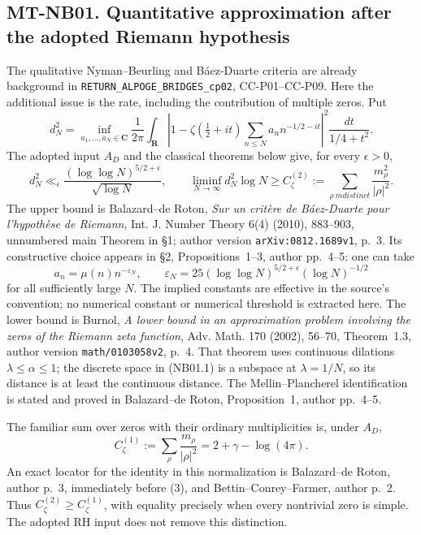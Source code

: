 \subsection*{MT-NB01. Quantitative approximation after the adopted Riemann hypothesis}

The qualitative Nyman--Beurling and B\'aez-Duarte criteria are
already background in \texttt{RETURN\_ALPOGE\_BRIDGES\_cp02},
CC-P01--CC-P09. Here the additional issue is the rate, including
the contribution of multiple zeros. Put
\[
 d_N^2=\inf_{a_1,\ldots,a_N\in\mathbf C}
 \frac1{2\pi}\int_{\mathbf R}
 \left|1-\zeta(\tfrac12+it)
       \sum_{n\le N}a_n n^{-1/2-it}\right|^2
                 \frac{dt}{1/4+t^2}.
 \tag{NB01.1}
\]
The adopted input $A_D$ and the classical theorems below give,
for every $\epsilon>0$,
\[
 d_N^2\ll_\epsilon
 \frac{(\log\log N)^{5/2+\epsilon}}{\sqrt{\log N}},
 \qquad
 \liminf_{N\to\infty}d_N^2\log N
       \ge C_\zeta^{(2)}
       :=\sum_{\rho\ {
m distinct}}
                    \frac{m_\rho^2}{|\rho|^2}.
 \tag{NB01.2}
\]
The upper bound is Balazard--de Roton,
\emph{Sur un crit\`ere de B\'aez-Duarte pour l'hypoth\`ese
de Riemann}, Int. J. Number Theory 6(4) (2010), 883--903,
unnumbered main Theorem in \S1; author version
\texttt{arXiv:0812.1689v1}, p.~3. Its constructive choice
appears in \S2, Propositions~1--3, author pp.~4--5:
one can take
\[
 a_n=\mu(n)n^{-\varepsilon_N},\qquad
 \varepsilon_N=25(\log\log N)^{5/2+\epsilon}
                         (\log N)^{-1/2}
 \tag{NB01.3}
\]
for all sufficiently large $N$. The implied constants are
effective in the source's convention; no numerical constant
or numerical threshold is extracted here.
The lower bound is Burnol, \emph{A lower bound in an
approximation problem involving the zeros of the Riemann
zeta function}, Adv. Math. 170 (2002), 56--70,
Theorem~1.3, author version \texttt{math/0103058v2}, p.~4.
That theorem uses continuous dilations $\lambda\le\alpha\le1$;
the discrete space in (NB01.1) is a subspace at $\lambda=1/N$,
so its distance is at least the continuous distance.
The Mellin--Plancherel identification is stated and proved in
Balazard--de Roton, Proposition~1, author pp.~4--5.

The familiar sum over zeros with their ordinary multiplicities
is, under $A_D$,
\[
 C_\zeta^{(1)}:=\sum_\rho\frac{m_\rho}{|\rho|^2}
                    =2+\gamma-\log(4\pi).
 \tag{NB01.4}
\]
An exact locator for the identity in this normalization is
Balazard--de Roton, author p.~3, immediately before (3),
and Bettin--Conrey--Farmer, author p.~2.
Thus $C_\zeta^{(2)}\ge C_\zeta^{(1)}$, with equality precisely
when every nontrivial zero is simple. The adopted RH input
does not remove this distinction.

